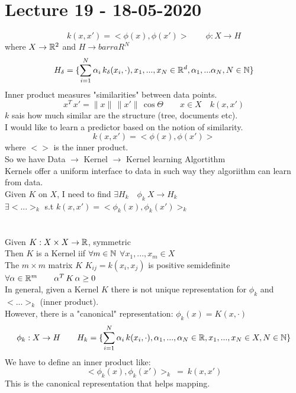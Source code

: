 \documentclass[../main.tex]{subfiles}
\begin{document}
\chapter{Lecture 19 - 18-05-2020}

$$
k(x,x') = < \phi(x), \phi(x')>
\qquad \phi: X \rightarrow H
$$
where $X \rightarrow \mathbb{R}^2$ and $H \rightarrow barra{R}^N $
$$
H_\delta = \{ \sum_{i =1}^N \alpha_i \, k_\delta (x_i, \cdot), x_1,..., x_N \in \mathbb{R}^d, \alpha_1, ... \alpha_N, N \in \mathbb{N } \} 
$$
Inner product measures "similarities" between data points.
\\
$$
x^T \, x' = \|x\| \, \|x'\| \, \cos \Theta \qquad x \in X \quad k(x,x')
$$
$k$ sais how much similar are the structure (tree, documents etc).
\\
I would like to learn a predictor based on the notion of similarity.
\\
$$
k(x,x') = < \phi(x), \phi(x')>
$$
where $<>$ is the inner product.
\\
So we have Data $\rightarrow$ Kernel $\rightarrow$ Kernel learning Algortithm
\\
Kernels offer a uniform interface to data in such way they algoriithm can learn from data.
\\
Given $K$ on $X$, I need to find $\exists H_k \quad \phi_k \ X \rightarrow H_k$
\\
$\exists <...>_k$ s.t $k(x,x') = <\phi_k(x), \phi_k(x')>_k $
\\\\
\\
Given $K: X \times X \rightarrow \mathbb{R}$, symmetric
\\
Then $K$ is a Kernel iif $\forall m \in \mathbb{N}$ $\forall x_1,...,x_m \in X$
\\
The $m \times m$ matrix $K$ \quad $K_{ij} = k (x_i,x_j)$ is positive semidefinite\\
$
\forall \alpha \in \mathbb{R}^m \qquad \alpha^T \, K \, \alpha \geq 0
$ 
\\
In general, given a Kernel $K$ there is not unique representation for $\phi_k$ and $<...>_k$ (inner product).
\\
However,  there is a "canonical" representation: 
$
\phi_k(x) = K(x, \cdot)
$
$$
\phi_k : X \rightarrow H \qquad H_k = \{ \sum_{i=1}^N \alpha_i \, k (x_i, \cdot ), \alpha_1,..., \alpha_N \in \mathbb{R}, x_1,...,x_N \in X, N \in \mathbb{N} \}
$$
We have to define an inner product like:
$$
<\phi_k(x), \phi_k(x')>_k \ = \ k(x,x')
$$
This is the canonical representation that helps mapping.
\end{document}
